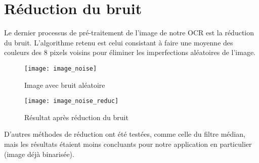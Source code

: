 \newpage

\section{Réduction du bruit}

Le dernier processus de pré-traitement de l'image de notre OCR est la réduction
du bruit. L'algorithme retenu est celui consistant à faire une moyenne des
couleurs des 8 pixels voisins pour éliminer les imperfections aléatoires de
l'image.

\begin{figure}[H]
    \centering
    \texttt{[image: image\_noise]}
    \caption{Image avec bruit aléatoire}
\end{figure}

\begin{figure}[H]
    \centering
    \texttt{[image: image\_noise\_reduc]}
    \caption{Résultat après réduction du bruit}
\end{figure}

D'autres méthodes de réduction ont été testées, comme celle du filtre médian,
mais les résultats étaient moins concluants pour notre application en
particulier (image déjà binarisée).
